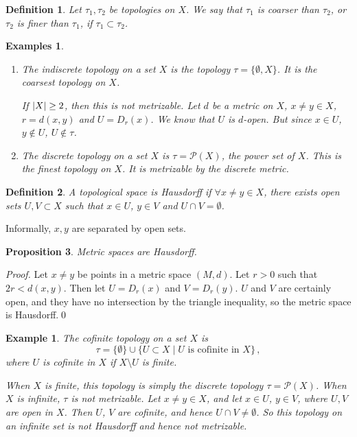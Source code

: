 \documentclass{article}
\theoremstyle{plain}\theoremheaderfont{\normalfont\itshape}\theorembodyfont{\rmfamily}\theoremseparator{.}\newtheorem*{rem}{Remark}\newtheorem*{ex}{Example}\newtheorem*{proof}{Proof}\newtheorem*{altp}{Alternative proof}
\theoremstyle{plain}\theoremheaderfont{\normalfont\bfseries}\theorembodyfont{\rmfamily}\theoremseparator{.}\newtheorem{thm}{Theorem}[section]\newtheorem{lem}[thm]{Lemma}\newtheorem{prop}[thm]{Proposition}\newtheorem*{cor}{Corollary}\newtheorem{defn}[thm]{Definition}\newtheorem{clm}[thm]{Claim}\newtheorem{clminproof}{Claim}
\theoremstyle{break}\theoremheaderfont{\normalfont\itshape}\theorembodyfont{\rmfamily}\theoremseparator{.\medskip}\newtheorem*{proofskip}{Proof}\newtheorem*{exs}{Examples}\newtheorem*{rems}{Remarks}
\theoremstyle{break}\theoremheaderfont{\normalfont\bfseries}\theorembodyfont{\rmfamily}\theoremseparator{.\medskip}\newtheorem{lemskip}[thm]{Lemma}\newtheorem{defnskip}[thm]{Definition}\newtheorem{propskip}[thm]{Proposition}\newtheorem{thmskip}[thm]{Theorem}
\newcommand{\qed}{\hfill\ensuremath{\Box}}
\begin{document}
    \begin{defn}
        Let \(\tau_1,\tau_2\) be topologies on \(X\). We say that \(\tau_1\) is \textit{coarser} than \(\tau_2\), or \(\tau_2\) is \textit{finer} than \(\tau_1\), if \(\tau_1\subset\tau_2\).
    \end{defn}
    
    \begin{exs}
        \begin{enumerate}[label=(\roman*),topsep=0pt]
            \item The \textit{indiscrete topology} on a set \(X\) is the topology \(\tau=\{\emptyset,X\}\). It is the coarsest topology on \(X\).
    
            If \(\abs{X}\ge 2\), then this is not metrizable. Let \(d\) be a metric on \(X\), \(x\ne y\in X\), \(r=d(x,y)\) and \(U=D_r(x)\). We know that \(U\) is \(d\)-open. But since \(x\in U\), \(y\notin U\), \(U\notin \tau\).
            \item The \textit{discrete topology} on a set \(X\) is \(\tau=\mathcal{P}(X)\), the power set of \(X\). This is the finest topology on \(X\). It is metrizable by the discrete metric.
        \end{enumerate}
    \end{exs}

    \begin{defn}
        A topological space is \textit{Hausdorff} if \(\forall x\ne y\in X\), there exists open sets \(U,V\subset X\) such that \(x\in U\), \(y\in V\) and \(U\cap V=\emptyset\).
    \end{defn}
    Informally, \(x,y\) are separated by open sets.

    \begin{prop}
        Metric spaces are Hausdorff.
    \end{prop}
    \begin{proof}
        Let \(x\ne y\) be points in a metric space \((M,d)\). Let \(r>0\) such that \(2r<d(x,y)\). Then let \(U=D_r(x)\) and \(V=D_r(y)\). \(U\) and \(V\) are certainly open, and they have no intersection by the triangle inequality, so the metric space is Hausdorff.\qed
    \end{proof}
    \begin{ex}
        The \textit{cofinite topology} on a set \(X\) is
        \[\tau=\{\emptyset\}\cup\{U\subset X\mid U\text{ is cofinite in }X\}\,,\]
        where \(U\) is \textit{cofinite} in \(X\) if \(X\setminus U\) is finite.

        When \(X\) is finite, this topology is simply the discrete topology \(\tau=\mathcal{P}(X)\). When \(X\) is infinite, \(\tau\) is not metrizable. Let \(x\ne y\in X\), and let \(x\in U\), \(y\in V\), where \(U,V\) are open in \(X\). Then \(U\), \(V\) are cofinite, and hence \(U\cap V\ne\emptyset\). So this topology on an infinite set is not Hausdorff and hence not metrizable.
    \end{ex}
\end{document}
